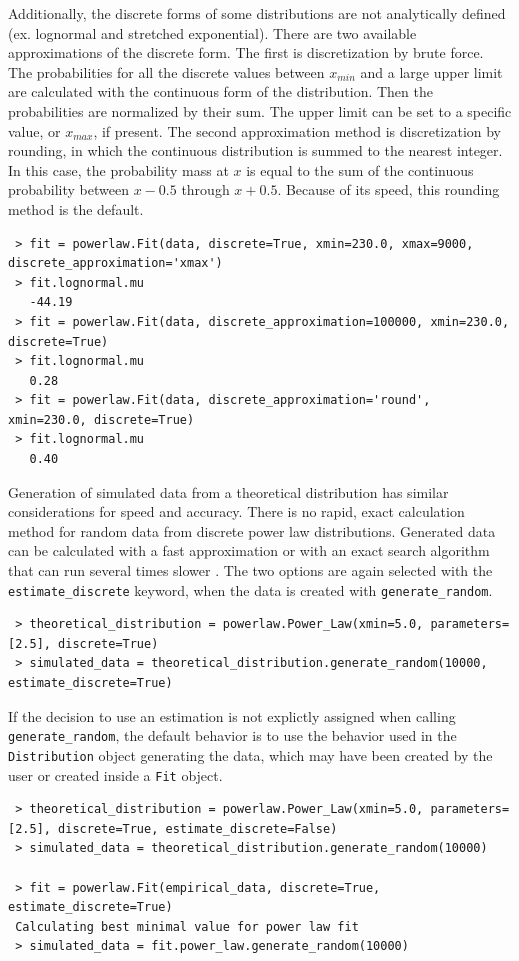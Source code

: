 \documentclass[10pt]{article}
\begin{document}
 Additionally, the discrete forms of some distributions are not analytically defined (ex. lognormal and stretched exponential). There are two available approximations of the discrete form. The first is discretization by brute force. The probabilities for all the discrete values between $x_{min}$ and a large upper limit are calculated with the continuous form of the distribution. Then the probabilities are normalized by their sum. The upper limit can be set to a specific value, or $x_{max}$, if present. The second approximation method is discretization by rounding, in which the continuous distribution is summed to the nearest integer. In this case, the probability mass at $x$ is equal to the sum of the continuous probability between $x-0.5$ through $x+0.5$. Because of its speed, this rounding method is the default.
 
 \begin{verbatim}
 > fit = powerlaw.Fit(data, discrete=True, xmin=230.0, xmax=9000, discrete_approximation='xmax')
 > fit.lognormal.mu
   -44.19
 > fit = powerlaw.Fit(data, discrete_approximation=100000, xmin=230.0, discrete=True)
 > fit.lognormal.mu
   0.28
 > fit = powerlaw.Fit(data, discrete_approximation='round', xmin=230.0, discrete=True)
 > fit.lognormal.mu
   0.40
 \end{verbatim}
 
 Generation of simulated data from a theoretical distribution has similar considerations for speed and accuracy. There is no rapid, exact calculation method for random data from discrete power law distributions. Generated data can be calculated with a fast approximation or with an exact search algorithm that can run several times slower \cite{Clauset2009}. The two options are again selected with the \verb$estimate_discrete$ keyword, when the data is created with \verb$generate_random$. 
 
 \begin{verbatim}
 > theoretical_distribution = powerlaw.Power_Law(xmin=5.0, parameters=[2.5], discrete=True)
 > simulated_data = theoretical_distribution.generate_random(10000, estimate_discrete=True)
 \end{verbatim}
 
 If the decision to use an estimation is not explictly assigned when calling \verb$generate_random$, the default behavior is to use the behavior used in the \verb$Distribution$ object generating the data, which may have been created by the user or created inside a \verb$Fit$ object.
 
 \begin{verbatim}
 > theoretical_distribution = powerlaw.Power_Law(xmin=5.0, parameters=[2.5], discrete=True, estimate_discrete=False)
 > simulated_data = theoretical_distribution.generate_random(10000)
 
 > fit = powerlaw.Fit(empirical_data, discrete=True, estimate_discrete=True)
 Calculating best minimal value for power law fit
 > simulated_data = fit.power_law.generate_random(10000)
 \end{verbatim}
 
\end{document}
